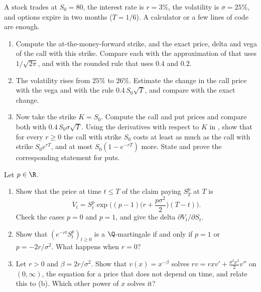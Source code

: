 
\begin{exercise}\label{ex:bs-thumb}
\easy A stock trades at $S_0=80$, the interest rate is $r=3\%$, the volatility is
$\sigma=25\%$, and options expire in two months ($T=1/6$). A calculator or a few lines of
code are enough.
\begin{enumerate}[label=(\alph*)]
  \item Compute the at-the-money-forward strike, and the exact price, delta and vega of the
    call with this strike. Compare each with the approximation of  that
    uses $1/\sqrt{2\pi}$, and with the rounded rule that uses $0.4$ and $0.2$.
  \item The volatility rises from $25\%$ to $26\%$. Estimate the change in the call price
    with the vega and with the rule $0.4\,S_0\sqrt T$, and compare with the exact change.
  \item Now take the strike $K=S_0$. Compute the call and put prices and compare both with
    $0.4\,S_0\sigma\sqrt T$. Using the derivatives with respect to $K$ in
    , show that for every $r\ge0$ the call with strike $S_0$ costs at
    least as much as the call with strike $S_0e^{rT}$, and at most $S_0(1-e^{-rT})$ more. State
    and prove the corresponding statement for puts.
\end{enumerate}
\end{exercise}

\begin{exercise}\label{ex:bs-power}
\easy Let $p\in\R$.
\begin{enumerate}[label=(\alph*)]
  \item Show that the price at time $t\le T$ of the claim paying $S_T^p$ at $T$ is
    \[
      V_t=S_t^p\exp\Big((p-1)\Big(r+\frac{p\sigma^2}{2}\Big)(T-t)\Big).
    \]
    Check the cases $p=0$ and $p=1$, and give the delta $\partial V_t/\partial S_t$.
  \item Show that $(e^{-rt}S_t^p)_{t\ge0}$ is a $\Q$-martingale if and only if $p=1$ or
    $p=-2r/\sigma^2$. What happens when $r=0$?
  \item Let $r>0$ and $\beta=2r/\sigma^2$. Show that $v(x)=x^{-\beta}$ solves
    $rv=rxv'+\frac{\sigma^2x^2}{2}v''$ on $(0,\infty)$, the equation 
    for a price that does not depend on time, and relate this to (b). Which other power
    of $x$ solves it?
\end{enumerate}
\end{exercise}

